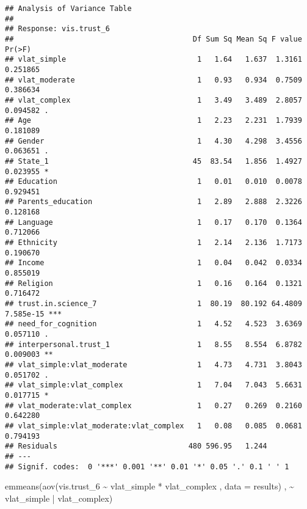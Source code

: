 \documentclass[
]{article}
\newenvironment{Shaded}{\begin{snugshade}}{\end{snugshade}}
\newcommand{\AttributeTok}[1]{\textcolor[rgb]{0.77,0.63,0.00}{#1}}
\newcommand{\FunctionTok}[1]{\textcolor[rgb]{0.00,0.00,0.00}{#1}}
\newcommand{\NormalTok}[1]{#1}
\newcommand{\SpecialCharTok}[1]{\textcolor[rgb]{0.00,0.00,0.00}{#1}}
\begin{document}
\begin{verbatim}
## Analysis of Variance Table
## 
## Response: vis.trust_6
##                                         Df Sum Sq Mean Sq F value    Pr(>F)    
## vlat_simple                              1   1.64   1.637  1.3161  0.251865    
## vlat_moderate                            1   0.93   0.934  0.7509  0.386634    
## vlat_complex                             1   3.49   3.489  2.8057  0.094582 .  
## Age                                      1   2.23   2.231  1.7939  0.181089    
## Gender                                   1   4.30   4.298  3.4556  0.063651 .  
## State_1                                 45  83.54   1.856  1.4927  0.023955 *  
## Education                                1   0.01   0.010  0.0078  0.929451    
## Parents_education                        1   2.89   2.888  2.3226  0.128168    
## Language                                 1   0.17   0.170  0.1364  0.712066    
## Ethnicity                                1   2.14   2.136  1.7173  0.190670    
## Income                                   1   0.04   0.042  0.0334  0.855019    
## Religion                                 1   0.16   0.164  0.1321  0.716472    
## trust.in.science_7                       1  80.19  80.192 64.4809 7.585e-15 ***
## need_for_cognition                       1   4.52   4.523  3.6369  0.057110 .  
## interpersonal.trust_1                    1   8.55   8.554  6.8782  0.009003 ** 
## vlat_simple:vlat_moderate                1   4.73   4.731  3.8043  0.051702 .  
## vlat_simple:vlat_complex                 1   7.04   7.043  5.6631  0.017715 *  
## vlat_moderate:vlat_complex               1   0.27   0.269  0.2160  0.642280    
## vlat_simple:vlat_moderate:vlat_complex   1   0.08   0.085  0.0681  0.794193    
## Residuals                              480 596.95   1.244                      
## ---
## Signif. codes:  0 '***' 0.001 '**' 0.01 '*' 0.05 '.' 0.1 ' ' 1
\end{verbatim}

\begin{Shaded}
\begin{Highlighting}[]
\FunctionTok{emmeans}\NormalTok{(}\FunctionTok{aov}\NormalTok{(vis.trust\_6 }\SpecialCharTok{\textasciitilde{}}\NormalTok{ vlat\_simple }\SpecialCharTok{*}\NormalTok{ vlat\_complex , }\AttributeTok{data =}\NormalTok{ results) , }\SpecialCharTok{\textasciitilde{}}\NormalTok{ vlat\_simple }\SpecialCharTok{|}\NormalTok{ vlat\_complex)}
\end{Highlighting}
\end{Shaded}
\end{document}
